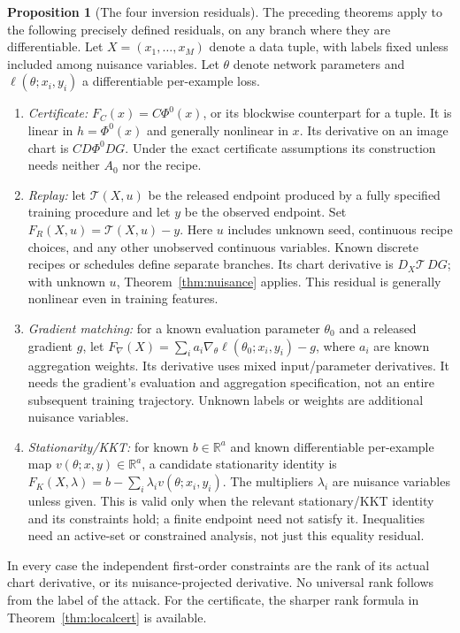 \documentclass[11pt,a4paper]{article}
\theoremstyle{definition}
\newtheorem{proposition}[theorem]{Proposition}
\theoremstyle{definition}
\theoremstyle{remark}\newtheorem{remark}[theorem]{Remark}
\newcommand{\R}{\mathbb R}\newcommand{\Prob}{\mathbb P}\newcommand{\E}{\mathbb E}
\begin{document}
\begin{proposition}[The four inversion residuals]\label{prop:four}
The preceding theorems apply to the following precisely defined residuals, on any branch where they are differentiable. Let $X=(x_1,\ldots,x_M)$ denote a data tuple, with labels fixed unless included among nuisance variables. Let $\theta$ denote network parameters and $\ell(\theta;x_i,y_i)$ a differentiable per-example loss.
\begin{enumerate}
\item \emph{Certificate:} $F_C(x)=C\Phi^0(x)$, or its blockwise counterpart for a tuple. It is linear in $h=\Phi^0(x)$ and generally nonlinear in $x$. Its derivative on an image chart is $CD\Phi^0DG$. Under the exact certificate assumptions its construction needs neither $A_0$ nor the recipe.
\item \emph{Replay:} let $\mathcal T(X,u)$ be the released endpoint produced by a fully specified training procedure and let $y$ be the observed endpoint. Set $F_R(X,u)=\mathcal T(X,u)-y$. Here $u$ includes unknown seed, continuous recipe choices, and any other unobserved continuous variables. Known discrete recipes or schedules define separate branches. Its chart derivative is $D_X\mathcal T\,DG$; with unknown $u$, Theorem~\ref{thm:nuisance} applies. This residual is generally nonlinear even in training features.
\item \emph{Gradient matching:} for a known evaluation parameter $\theta_0$ and a released gradient $g$, let $F_\nabla(X)=\sum_i a_i\nabla_\theta\ell(\theta_0;x_i,y_i)-g$, where $a_i$ are known aggregation weights. Its derivative uses mixed input/parameter derivatives. It needs the gradient's evaluation and aggregation specification, not an entire subsequent training trajectory. Unknown labels or weights are additional nuisance variables.
\item \emph{Stationarity/KKT:} for known $b\in\R^a$ and known differentiable per-example map $v(\theta;x,y)\in\R^a$, a candidate stationarity identity is $F_K(X,\lambda)=b-\sum_i\lambda_i v(\theta;x_i,y_i)$. The multipliers $\lambda_i$ are nuisance variables unless given. This is valid only when the relevant stationary/KKT identity and its constraints hold; a finite endpoint need not satisfy it. Inequalities need an active-set or constrained analysis, not just this equality residual.
\end{enumerate}
In every case the independent first-order constraints are the rank of its actual chart derivative, or its nuisance-projected derivative. No universal rank follows from the label of the attack. For the certificate, the sharper rank formula in Theorem~\ref{thm:localcert} is available.
\end{proposition}
\end{document}
